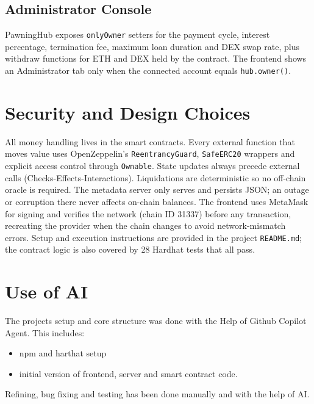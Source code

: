 \documentclass[12pt,a4paper]{article}
\begin{document}
\subsection{Administrator Console}
PawningHub exposes \texttt{onlyOwner} setters for the payment cycle, interest percentage, termination fee, maximum loan duration and DEX swap rate, plus withdraw functions for ETH and DEX held by the contract. The frontend shows an Administrator tab only when the connected account equals \texttt{hub.owner()}.

\section{Security and Design Choices}

All money handling lives in the smart contracts. Every external function that moves value uses OpenZeppelin's \texttt{ReentrancyGuard}, \texttt{SafeERC20} wrappers and explicit access control through \texttt{Ownable}. State updates always precede external calls (Checks-Effects-Interactions). Liquidations are deterministic so no off-chain oracle is required. The metadata server only serves and persists JSON; an outage or corruption there never affects on-chain balances. The frontend uses MetaMask for signing and verifies the network (chain ID 31337) before any transaction, recreating the provider when the chain changes to avoid network-mismatch errors. Setup and execution instructions are provided in the project \texttt{README.md}; the contract logic is also covered by 28 Hardhat tests that all pass.

\section{Use of AI}
The projects setup and core structure was done with the Help of Github Copilot Agent. 
This includes:
\begin{itemize}
    \item npm and harthat setup
    \item initial version of frontend, server and smart contract code.
\end{itemize}
Refining, bug fixing and testing has been done manually and with the help of AI.
\end{document}
